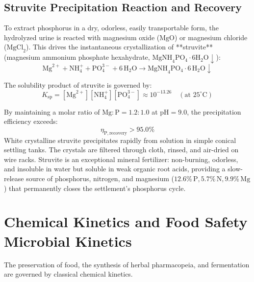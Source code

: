 \subsection{Struvite Precipitation Reaction and Recovery}

To extract phosphorus in a dry, odorless, easily transportable form, the hydrolyzed urine is reacted with magnesium oxide ($\mathrm{MgO}$) or magnesium chloride ($\mathrm{MgCl}_2$). This drives the instantaneous crystallization of **struvite** (magnesium ammonium phosphate hexahydrate, $\mathrm{MgNH}_4\mathrm{PO}_4 \cdot 6\mathrm{H}_2\mathrm{O} \downarrow$):
\begin{equation}
\mathrm{Mg}^{2+} + \mathrm{NH}_4^+ + \mathrm{PO}_4^{3-} + 6\,\mathrm{H}_2\mathrm{O} \longrightarrow \mathrm{MgNH}_4\mathrm{PO}_4 \cdot 6\,\mathrm{H}_2\mathrm{O} \downarrow
\label{eq:struvite_precipitation}
\end{equation}

The solubility product of struvite is governed by:
\begin{equation}
K_{\mathrm{sp}} = [\mathrm{Mg}^{2+}][\mathrm{NH}_4^+][\mathrm{PO}_4^{3-}] \approx 10^{-13.26} \quad (\text{at } 25^\circ\mathrm{C})
\label{eq:struvite_ksp}
\end{equation}

By maintaining a molar ratio of $\mathrm{Mg}:\mathrm{P} = 1.2:1.0$ at $\mathrm{pH} = 9.0$, the precipitation efficiency exceeds:
\begin{equation}
\eta_{\mathrm{P, recovery}} > 95.0\%
\label{eq:phosphorus_recovery_eff}
\end{equation}
White crystalline struvite precipitates rapidly from solution in simple conical settling tanks. The crystals are filtered through cloth, rinsed, and air-dried on wire racks. Struvite is an exceptional mineral fertilizer: non-burning, odorless, and insoluble in water but soluble in weak organic root acids, providing a slow-release source of phosphorus, nitrogen, and magnesium ($12.6\%\,\mathrm{P}, 5.7\%\,\mathrm{N}, 9.9\%\,\mathrm{Mg}$) that permanently closes the settlement's phosphorus cycle.

\section{Chemical Kinetics and Food Safety Microbial Kinetics}

The preservation of food, the synthesis of herbal pharmacopeia, and fermentation are governed by classical chemical kinetics.

